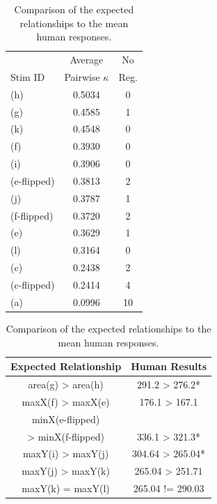 \documentclass[11pt,letterpaper]{article}
\begin{document}
\begin{table}[t]
\parbox{.50\linewidth}{
\centering 
\begin{tabular}{l c c}
 & Average & No \\
Stim ID & Pairwise $\kappa$ & Reg.\\
\hline
\hline
(h) & 0.5034 & 0\\ %
(g) & 0.4585 & 1\\ %
(k) & 0.4548 & 0\\ %
(f) & 0.3930 & 0\\ %
(i) & 0.3906 & 0\\ %
(e-flipped) & 0.3813 & 2\\ %
(j) & 0.3787 & 1\\ %
(f-flipped) & 0.3720 & 2\\ %
(e) & 0.3629 & 1\\ %
(l) & 0.3164& 0\\ %
(c) & 0.2438 & 2\\ %
(c-flipped) & 0.2414 & 4\\ %
(a) & 0.0996 & 10 \\ %
\hline
\end{tabular}
\caption{The average pairwise $\kappa$ scores and the number of no region response by visual stimuli.}
\label{tab:stimuli-kappa-scores}
}
\hfill
\parbox{.50\linewidth}{
\centering
\begin{tabular}{c c}
Expected Relationship & Human Results  \\
\hline
\hline
area(g) > area(h) & 291.2 > 276.2* \\
maxX(f) > maxX(e) & 176.1 > 167.1 \\
minX(e-flipped)  &  \\
 > minX(f-flipped) & 336.1 > 321.3* \\
maxY(i) > maxY(j) & 304.64 > 265.04* \\
maxY(j) > maxY(k) & 265.04 > 251.71 \\
maxY(k) = maxY(l) & 265.04 != 290.03 \\
\hline
\end{tabular}
\caption{Comparison of the expected relationships to the mean human responses.}
\label{tab:region-location-tests}
}
\end{table}
\end{document}
